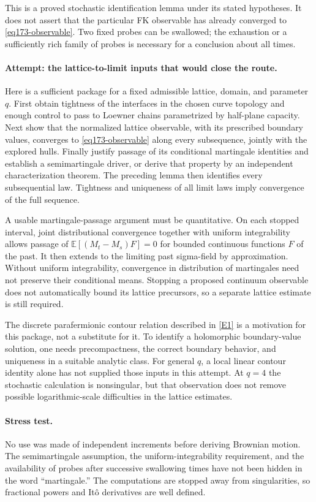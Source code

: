 \documentclass[11pt,a4paper]{article}
\newcommand{\E}{\mathbb{E}}
\newcommand{\eref}[2]{\hyperlink{extra:#1:#2}{[E#2]}}
\numberwithin{equation}{section}
\begin{document}
This is a proved stochastic identification lemma under its stated
hypotheses. It does not assert that the particular FK observable has
already converged to \eqref{eq173-observable}. Two fixed probes can be
swallowed; the exhaustion or a sufficiently rich family of probes is
necessary for a conclusion about all times.

\paragraph{Attempt: the lattice-to-limit inputs that would close the route.}
Here is a sufficient package for a fixed admissible lattice, domain, and
parameter $q$. First obtain tightness of the interfaces in the chosen curve
topology and enough control to pass to Loewner chains parametrized by
half-plane capacity. Next show that the normalized lattice observable,
with its prescribed boundary values, converges to
\eqref{eq173-observable} along every subsequence, jointly with the explored
hulls. Finally justify passage of its conditional martingale identities
and establish a semimartingale driver, or derive that property by an
independent characterization theorem. The preceding lemma then identifies
every subsequential law. Tightness and uniqueness of all limit laws imply
convergence of the full sequence.

A usable martingale-passage argument must be quantitative. On each stopped
interval, joint distributional convergence together with uniform
integrability allows passage of
$\E[(M_t-M_s)F]=0$ for bounded continuous functions $F$ of the past.
It then extends to the limiting past sigma-field by approximation. Without
uniform integrability, convergence in distribution of martingales need
not preserve their conditional means. Stopping a proposed continuum
observable does not automatically bound its lattice precursors, so a
separate lattice estimate is still required.

The discrete parafermionic contour relation described in \eref{statement}{1}
is a motivation for this package, not a substitute for it. To identify a
holomorphic boundary-value solution, one needs precompactness, the correct
boundary behavior, and uniqueness in a suitable analytic class. For general
$q$, a local linear contour identity alone has not supplied those inputs
in this attempt. At $q=4$ the stochastic calculation is nonsingular, but
that observation does not remove possible logarithmic-scale difficulties
in the lattice estimates.

\paragraph{Stress test.}
No use was made of independent increments before deriving Brownian motion.
The semimartingale assumption, the uniform-integrability requirement, and
the availability of probes after successive swallowing times have not been
hidden in the word ``martingale.'' The computations are stopped away from
singularities, so fractional powers and It\^o derivatives are well defined.
\end{document}
